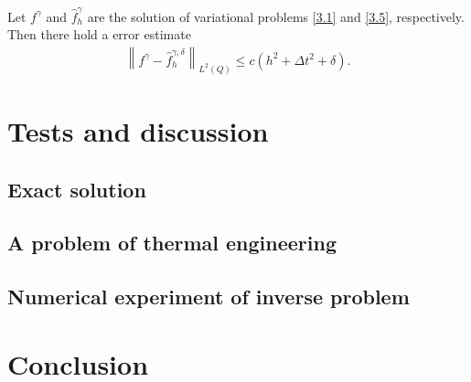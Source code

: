 \documentclass[notitlepage,a4paper,fleqn,9pt]{icmfarticle}
\begin{document}
\begin{multicols}{2}
\begin{cy}\label{cy3.1}
	Let $f^\gamma$ and $\hat{f}^\gamma_h$ are the solution of variational problems \eqref{3.1} and \eqref{3.5}, respectively. Then there hold a error estimate
	\begin{align}\label{3.12}
	\left\|f^\gamma-\hat{f}^{\gamma, \delta}_h \right\|_{L^2(Q)}\leq c(h^2+\Delta t^2+\delta).
	\end{align}
\end{cy}


\section{Tests and discussion}
\subsection{Exact solution}



\subsection{A problem of thermal engineering}



\subsection{Numerical experiment of inverse problem}



\section{Conclusion}



{}
\vfill
\end{multicols}
\end{document}
